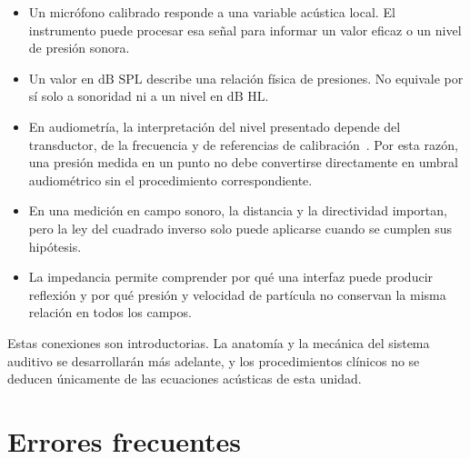 \begin{itemize}
    \item Un micrófono calibrado responde a una variable acústica local. El
    instrumento puede procesar esa señal para informar un valor eficaz o un
    nivel de presión sonora.

    \item Un valor en \(\text{dB SPL}\) describe una relación física de
    presiones. No equivale por sí solo a sonoridad ni a un nivel en
    \(\text{dB HL}\).

    \item En audiometría, la interpretación del nivel presentado
    depende del transductor, de la frecuencia y de referencias de
    calibración~\cite{iso8253_1_2010,iso8253_2_2009}. Por esta razón, una presión medida en un punto no debe
    convertirse directamente en umbral audiométrico sin el procedimiento
    correspondiente.

    \item En una medición en campo sonoro, la distancia y la directividad
    importan, pero la ley del cuadrado inverso solo puede aplicarse cuando se
    cumplen sus hipótesis.

    \item La impedancia permite comprender por qué una interfaz puede producir
    reflexión y por qué presión y velocidad de partícula no conservan la misma
    relación en todos los campos.
\end{itemize}

Estas conexiones son introductorias. La anatomía y la mecánica del sistema
auditivo se desarrollarán más adelante, y los procedimientos clínicos no se
deducen únicamente de las ecuaciones acústicas de esta unidad.

\section{Errores frecuentes}
\label{sec:u4-errores}

